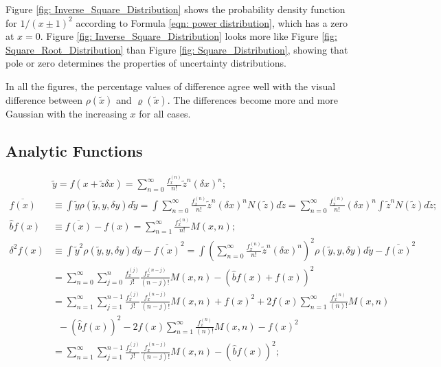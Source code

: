 \documentclass[twoside]{article}
\numberwithin{equation}{section}
\begin{document}
Figure \ref{fig: Inverse_Square_Distribution} shows the probability density function for $1/(x \pm 1)^2$ according to Formula \eqref{eqn: power distribution}, which has a zero at $x=0$.
Figure \ref{fig: Inverse_Square_Distribution} looks more like Figure \ref{fig: Square_Root_Distribution} than Figure \ref{fig: Square_Distribution}, showing that pole or zero determines the properties of uncertainty distributions.

In all the figures, the percentage values of difference agree well with the visual difference between $\rho(\tilde{x})$ and $\varrho(\tilde{x})$.
The differences become more and more Gaussian with the increasing $x$ for all cases.
 



\subsection{Analytic Functions}

\iffalse

\begin{align*}
& \tilde{y} = f(x + \tilde{z} \delta x) = \sum_{n=0}^{\infty} \frac{f^{(n)}_x}{n!} \tilde{z}^n (\delta x)^n; \\
\overline{f(x)} &\equiv \int \tilde{y} \rho(\tilde{y}, y, \delta y) d \tilde{y}
 = \int \sum_{n=0}^{\infty} \frac{f^{(n)}_x}{n!} \tilde{z}^n (\delta x)^n N(\tilde{z}) d \tilde{z}
 = \sum_{n=0}^{\infty} \frac{f^{(n)}_x}{n!} (\delta x)^{n} \int \tilde{z}^n N(\tilde{z}) d \tilde{z}; \\
\hat{b} f(x) &\equiv \overline{f(x)} - f(x) = \sum_{n=1}^{\infty} \frac{f^{(n)}_x}{n!} M(x,n); \\
\delta^2 f(x) &\equiv \int \tilde{y}^2 \rho(\tilde{y}, y, \delta y) d \tilde{y} - \overline{f(x)}^2
 = \int (\sum_{n=0}^{\infty} \frac{f^{(n)}_x}{n!} \tilde{z}^n (\delta x)^n)^2 \rho(\tilde{y}, y, \delta y) d \tilde{y} - \overline{f(x)}^2 \\
&= \sum_{n=0}^{\infty} \sum_{j=0}^{n} \frac{f^{(j)}_x}{j!} \frac{f^{(n-j)}_x}{(n-j)!} M(x, n)
 - \left(\hat{b} f(x) + f(x) \right)^2 \\
&= \sum_{n=1}^{\infty} \sum_{j=1}^{n-1} \frac{f^{(j)}_x}{j!} \frac{f^{(n-j)}_x}{(n-j)!} M(x, n) + f(x)^2
 + 2 f(x) \sum_{n=1}^{\infty} \frac{f^{(n)}_x}{(n)!} M(x, n) \\
&\;\;- (\hat{b} f(x))^2 - 2 f(x) \sum_{n=1}^{\infty} \frac{f^{(n)}_x}{(n)!} M(x, n) - f(x)^2  \\
&= \sum_{n=1}^{\infty} \sum_{j=1}^{n-1} \frac{f^{(j)}_x}{j!} \frac{f^{(n-j)}_x}{(n-j)!} M(x, n) - (\hat{b} f(x))^2;
\end{align*}
\end{document}
